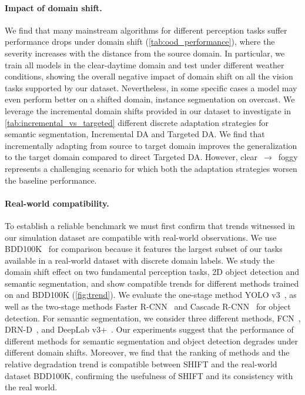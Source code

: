 \paragraph{Impact of domain shift.} We find that many mainstream algorithms for different perception tasks suffer performance drops under domain shift (\autoref{tab:ood_performance}), where the severity increases with the distance from the source domain.
In particular, we train all models in the clear-daytime domain and test under different weather conditions, showing the overall negative impact of domain shift on all the vision tasks supported by our dataset. Nevertheless, in some specific cases a model may even perform better on a shifted domain, \eg{} instance segmentation on overcast. 
We leverage the incremental domain shifts provided in our dataset to investigate in \autoref{tab:incremental_vs_targeted} different discrete adaptation strategies for semantic segmentation, \ie{} Incremental DA and Targeted DA. We find that incrementally adapting from source to target domain improves the generalization to the target domain compared to direct Targeted DA. 
However, clear~$\xrightarrow{}$~foggy represents a challenging scenario for which both the adaptation strategies worsen the baseline performance.

\paragraph{Real-world compatibility.} To establish a reliable benchmark we must first confirm that trends witnessed in our simulation dataset are compatible with real-world observations.
We use BDD100K~\cite{bdd100k} for  comparison because it features the largest subset of our tasks available in a real-world dataset with discrete domain labels.
We study the domain shift effect on two fundamental perception tasks, \ie{} 2D object detection and semantic segmentation, and show compatible trends for different methods trained on \thedataset{} and BDD100K (\autoref{fig:trend}). 
We evaluate the one-stage method YOLO v3~\cite{redmon2018yolov3}, as well as the two-stage methods Faster R-CNN~\cite{ren2015faster} and Cascade R-CNN~\cite{cai2018cascade} for object detection. For semantic segmentation, we consider three different methods, FCN~\cite{long2015fully}, DRN-D~\cite{yu2017dilated}, and DeepLab v3+~\cite{chen2017deeplab}. 
Our experiments suggest that the performance of different methods for semantic segmentation and object detection degrades under different domain shifts. Moreover, we find that the ranking of methods and the relative degradation trend is compatible between SHIFT and the real-world dataset BDD100K, confirming the usefulness of SHIFT and its consistency with the real world.

